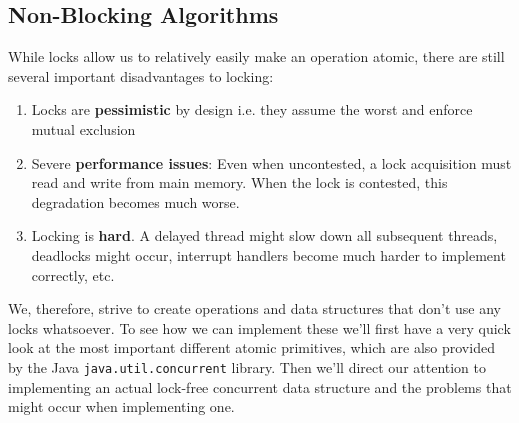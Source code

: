 \documentclass[main]{subfiles}
\begin{document}
\subsection{Non-Blocking Algorithms}
While locks allow us to relatively easily make an operation atomic, there are still several important disadvantages to locking:
\begin{enumerate}
    \item Locks are \textbf{pessimistic} by design i.e. they assume the worst and enforce mutual exclusion
    \item Severe \textbf{performance issues}: Even when uncontested, a lock acquisition must read and write from main memory. When the lock is contested, this degradation becomes much worse.
    \item Locking is \textbf{hard}. A delayed thread might slow down all subsequent threads, deadlocks might occur, interrupt handlers become much harder to implement correctly, etc.
\end{enumerate}
We, therefore, strive to create operations and data structures that don't use any locks whatsoever. To see how we can implement these we'll first have a very quick look at the most important different atomic primitives, which are also provided by the Java \texttt{java.util.concurrent} library. Then we'll direct our attention to implementing an actual lock-free concurrent data structure and the problems that might occur when implementing one.
\end{document}
